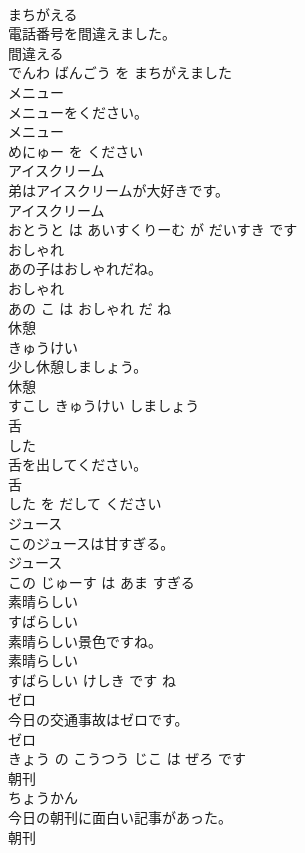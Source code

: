 \documentclass[8pt]{extreport}
\begin{document}
\begin{CJK}{UTF8}{min}
\\	まちがえる			
\\	電話番号を間違えました。	
\\	間違える 
\\	でんわ ばんごう を まちがえました			
\\	メニュー	
\\	メニューをください。	
\\	メニュー 
\\	めにゅー を ください			
\\	アイスクリーム	
\\	弟はアイスクリームが大好きです。	
\\	アイスクリーム 
\\	おとうと は あいすくりーむ が だいすき です			
\\	おしゃれ	
\\	あの子はおしゃれだね。	
\\	おしゃれ 
\\	あの こ は おしゃれ だ ね			
\\	休憩	
\\	きゅうけい			
\\	少し休憩しましょう。	
\\	休憩 
\\	すこし きゅうけい しましょう			
\\	舌	
\\	した			
\\	舌を出してください。	
\\	舌 
\\	した を だして ください			
\\	ジュース	
\\	このジュースは甘すぎる。	
\\	ジュース 
\\	この じゅーす は あま すぎる			
\\	素晴らしい	
\\	すばらしい			
\\	素晴らしい景色ですね。	
\\	素晴らしい 
\\	すばらしい けしき です ね			
\\	ゼロ	
\\	今日の交通事故はゼロです。	
\\	ゼロ 
\\	きょう の こうつう じこ は ぜろ です			
\\	朝刊	
\\	ちょうかん			
\\	今日の朝刊に面白い記事があった。	
\\	朝刊 

\end{CJK}
\end{document}
